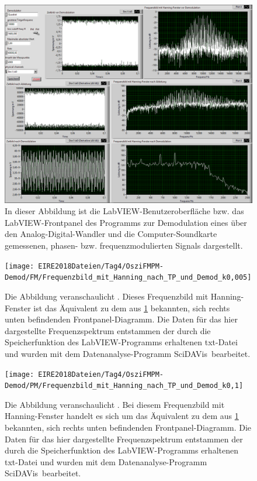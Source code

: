 \documentclass[
a4paper,
12pt,
pagesize,
ngerman
]{scrartcl}
\begin{document}
	\begin{figure}[H]
		\centering
		\includegraphics[width=1.0\textwidth]{EIRE2018Dateien/Tag4/OsziFMPM-Demod/FM/OsziPlusFMPMp}
		\caption{In dieser Abbildung ist die LabVIEW-Benutzeroberfläche bzw. das LabVIEW-Frontpanel des Programms zur Demodulation eines über den Analog-Digital-Wandler und die Computer-Soundkarte gemessenen, phasen- bzw. frequenzmodulierten Signals dargestellt.}
		\label{FMPMDemodFrontpanel}
	\end{figure}
	
	\begin{figure}[H] %
		\centering
		\texttt{[image: EIRE2018Dateien/Tag4/OsziFMPM-Demod/FM/Frequenzbild\_mit\_Hanning\_nach\_TP\_und\_Demod\_k0,005]}
		\caption{Die Abbildung veranschaulicht . Dieses Frequenzbild mit Hanning-Fenster ist das Äquivalent zu dem aus \cref{FMPMDemodFrontpanel} bekannten, sich rechts unten befindenden Frontpanel-Diagramm. Die Daten für das hier dargestellte Frequenzspektrum entstammen der durch die Speicherfunktion des LabVIEW-Programms erhaltenen txt-Datei und wurden mit dem Datenanalyse-Programm \glqq SciDAVis\grqq\ bearbeitet.}
	\end{figure}
	
	\begin{figure}[H] %
		\centering
		\texttt{[image: EIRE2018Dateien/Tag4/OsziFMPM-Demod/PM/Frequenzbild\_mit\_Hanning\_nach\_TP\_und\_Demod\_k0,1]}
		\caption{Die Abbildung veranschaulicht . Bei diesem Frequenzbild mit Hanning-Fenster handelt es sich um das Äquivalent zu dem aus \cref{FMPMDemodFrontpanel} bekannten, sich rechts unten befindenden Frontpanel-Diagramm. Die Daten für das hier dargestellte Frequenzspektrum entstammen der durch die Speicherfunktion des LabVIEW-Programms erhaltenen txt-Datei und wurden mit dem Datenanalyse-Programm \glqq SciDAVis\grqq\ bearbeitet.}
	\end{figure}
	
\end{document}
